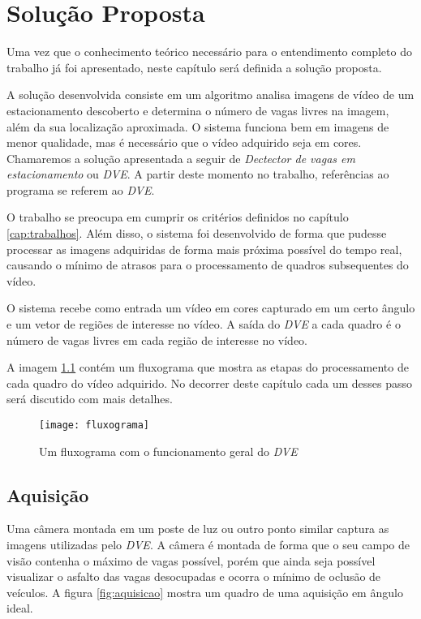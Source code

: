 \chapter{Solução Proposta}\label{cap:solucao}

Uma vez que o conhecimento teórico necessário para o entendimento completo do trabalho já foi apresentado, neste capítulo será definida a solução proposta.

A solução desenvolvida consiste em um algoritmo analisa imagens de vídeo de um estacionamento descoberto e determina o número de vagas livres na imagem, além da sua localização aproximada. O sistema funciona bem em imagens de menor qualidade, mas é necessário que o vídeo adquirido seja em cores. Chamaremos a solução apresentada a seguir de \textit{Dectector de vagas em estacionamento} ou \textit{DVE}. A partir deste momento no trabalho, referências ao programa se referem ao \textit{DVE}.

O trabalho se preocupa em cumprir os critérios definidos no capítulo \ref{cap:trabalhos}. Além disso, o sistema foi desenvolvido de forma que pudesse processar as imagens adquiridas de forma mais próxima possível do tempo real, causando o mínimo de atrasos para o processamento de quadros subsequentes do vídeo.

O sistema recebe como entrada um vídeo em cores capturado em um certo ângulo e um vetor de regiões de interesse no vídeo. A saída do \textit{DVE} a cada quadro é o número de vagas livres em cada região de interesse no vídeo.

A imagem \ref{fig:fluxograma} contém um fluxograma que mostra as etapas do processamento de cada quadro do vídeo adquirido. No decorrer deste capítulo cada um desses passo será discutido com mais detalhes.

\begin{figure}
	\centering
	\texttt{[image: fluxograma]}
	\label{fig:fluxograma}
	\caption{Um fluxograma com o funcionamento geral do \textit{DVE}}
	\centering
\end{figure}



\section{Aquisição}\label{sec:aquisicao}

Uma câmera montada em um poste de luz ou outro ponto similar captura as imagens utilizadas pelo \textit{DVE}. A câmera é montada de forma que o seu campo de visão contenha o máximo de vagas possível, porém que ainda seja possível visualizar o asfalto das vagas desocupadas e ocorra o mínimo de oclusão de veículos. A figura \ref{fig:aquisicao} mostra um quadro de uma aquisição em ângulo ideal.

